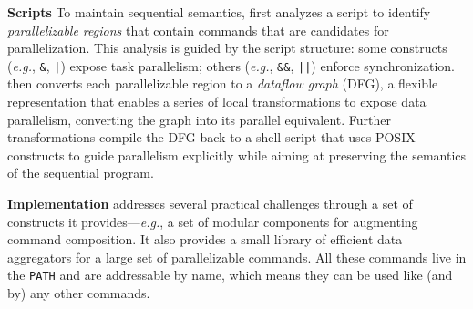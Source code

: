 \documentclass[letterpaper,twocolumn,10pt]{article}
\newcommand{\eg}{{\em e.g.}, }
\newcommand{\heading}[1]{\vspace{4pt}\noindent\textbf{#1}\enspace}
\newcommand{\ttt}[1]{\texttt{#1}}
\newcommand{\kk}[1]{[{\color{magenta}kk: #1}]}
\begin{document}
\heading{Scripts}
To maintain sequential semantics, \sys first analyzes a script to identify \emph{parallelizable regions} that contain commands that are candidates for parallelization.
This analysis is guided by the script structure: %
  some constructs (\eg \ttt{\&}, \ttt{|}) expose task parallelism; others (\eg \ttt{\&\&}, \ttt{||}) enforce synchronization.
\sys then converts each parallelizable region to a \emph{dataflow graph} (DFG), 
  a flexible representation that enables a series of local transformations to expose data parallelism, converting the graph into its parallel equivalent.
Further transformations compile the DFG back to a shell script that uses POSIX constructs to guide parallelism explicitly while aiming at preserving the semantics of the sequential program.

\heading{Implementation}
\sys addresses several practical challenges through a set of constructs it provides---\eg a set of
modular components for augmenting command composition.
It also provides a small library of efficient data aggregators for a large set of parallelizable commands.
All these commands live in the \ttt{PATH} and are addressable by name, which means they can be used like (and by) any other commands.
\end{document}
